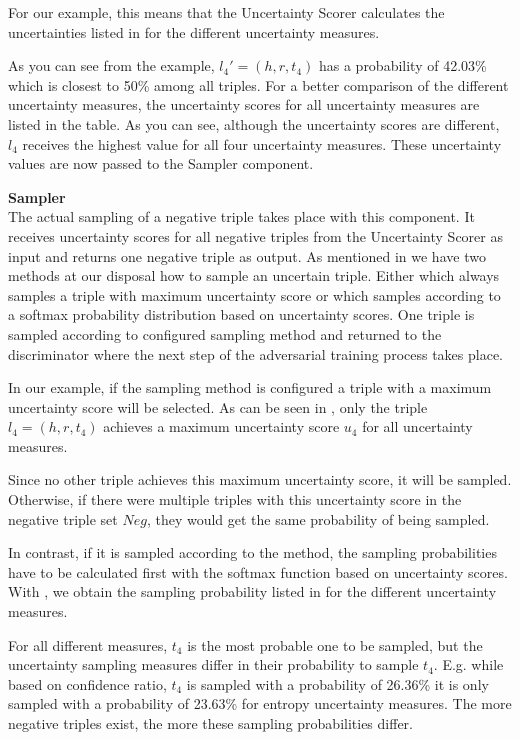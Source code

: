 For our example, this means that the Uncertainty Scorer calculates the uncertainties listed in  for the different uncertainty measures.

As you can see from the example, $l_4' = (h, r, t_4)$ has a probability of 42.03\% which is closest to 50\% among all triples.
For a better comparison of the different uncertainty measures, the uncertainty scores for all uncertainty measures are listed in the table.
As you can see, although the uncertainty scores are different, $l_4$ receives the highest value for all four uncertainty measures.
These uncertainty values are now passed to the Sampler component.

\textbf{Sampler} \\
The actual sampling of a negative triple takes place with this component.
It receives uncertainty scores for all negative triples from the Uncertainty Scorer as input and returns one negative triple as output.
As mentioned in  we have two methods at our disposal how to sample an uncertain triple.
Either \usmax which always samples a triple with maximum uncertainty score or \ussoftmax which samples according to a softmax probability distribution based on uncertainty scores.
One triple is sampled according to configured sampling method and returned to the discriminator where the next step of the adversarial training process takes place.

In our example, if the \usmax sampling method is configured a triple with a maximum uncertainty score will be selected.
As can be seen in , only the triple $l_4 = (h,r,t_4)$ achieves a maximum uncertainty score $u_4$ for all uncertainty measures.

Since no other triple achieves this maximum uncertainty score, it will be sampled.
Otherwise, if there were multiple triples with this uncertainty score in the negative triple set $Neg$, they would get the same probability of being sampled.

In contrast, if it is sampled according to the \ussoftmax method, the sampling probabilities have to be calculated first with the softmax function based on uncertainty scores.
With , we obtain the sampling probability listed in  for the different uncertainty measures.

For all different measures, $t_4$ is the most probable one to be sampled, but the uncertainty sampling measures differ in their probability to sample $t_4$.
E.g. while based on confidence ratio, $t_4$ is sampled with a probability of 26.36\% it is only sampled with a probability of 23.63\% for entropy uncertainty measures.
The more negative triples exist, the more these sampling probabilities differ.